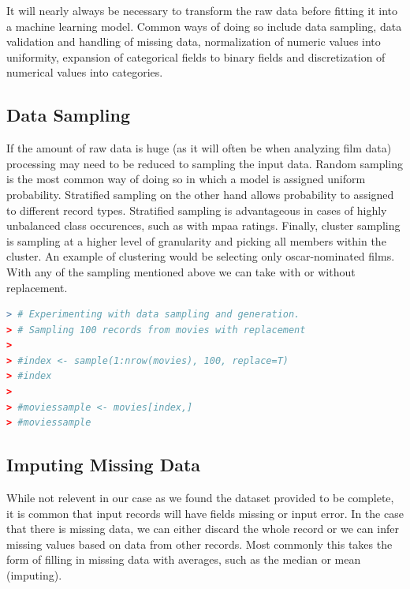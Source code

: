 \documentclass{article}
\begin{document}
\begin{spacing}{1.1}
It will nearly always be necessary to transform the raw data before fitting it into a machine learning model.  Common ways of doing so include data sampling, data validation and handling of missing data, normalization of numeric values into uniformity, expansion of categorical fields to binary fields and discretization of numerical values into categories. 

\subsection{Data Sampling}

If the amount of raw data is huge (as it will often be when analyzing film data) processing may need to be reduced to sampling the input data.  Random sampling is the most common way of doing so in which a model is assigned uniform probability.  Stratified sampling on the other hand allows probability to assigned to different record types.   Stratified sampling is advantageous in cases of highly unbalanced class occurences, such as with mpaa ratings.  Finally, cluster sampling is sampling at a higher level of granularity and picking all members within the cluster.  An example of clustering would be selecting only oscar-nominated films.  With any of the sampling mentioned above we can take with or without replacement.  

\vspace{3mm}

\begin{lstlisting}[language=R]
> # Experimenting with data sampling and generation.    
> # Sampling 100 records from movies with replacement
> 
> #index <- sample(1:nrow(movies), 100, replace=T)
> #index
> 
> #moviessample <- movies[index,]
> #moviessample
\end{lstlisting}

\subsection{Imputing Missing Data}

While not relevent in our case as we found the dataset provided to be complete, it is common that input records will have fields missing or input error.  In the case that there is missing data, we can either discard the whole record or we can infer missing values based on data from other records.  Most commonly this takes the form of filling in missing data with averages, such as the median or mean (imputing).  

\vspace{3mm}


\end{spacing}
\end{document}
